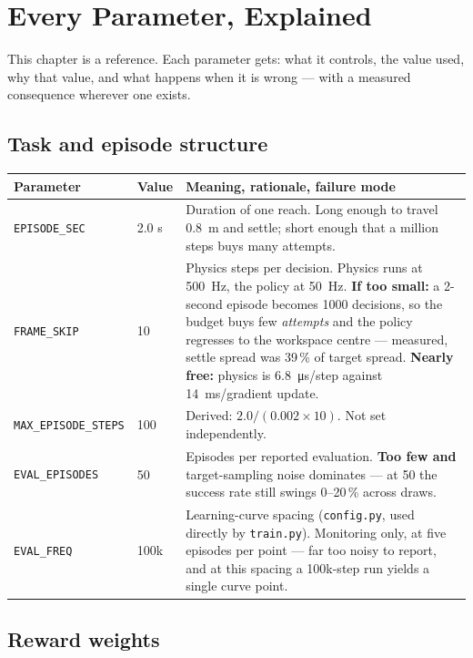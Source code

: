 \chapter{Every Parameter, Explained}

This chapter is a reference. Each parameter gets: what it controls, the value
used, why that value, and what happens when it is wrong --- with a measured
consequence wherever one exists.

\section{Task and episode structure}

\begin{longtable}{@{} L{3.4cm} C{2.0cm} L{9.0cm} @{}}
\toprule
\textbf{Parameter} & \textbf{Value} & \textbf{Meaning, rationale, failure mode} \\
\midrule
\endhead
\texttt{EPISODE\_SEC} & 2.0 s & Duration of one reach. Long enough to travel \SI{0.8}{\meter} and settle; short enough that a million steps buys many attempts. \\
\texttt{FRAME\_SKIP} & 10 & Physics steps per decision. Physics runs at \SI{500}{\hertz}, the policy at \SI{50}{\hertz}. \textbf{If too small:} a 2-second episode becomes 1000 decisions, so the budget buys few \emph{attempts} and the policy regresses to the workspace centre --- measured, settle spread was 39\,\% of target spread. \textbf{Nearly free:} physics is \SI{6.8}{\micro\second}/step against \SI{14}{\milli\second}/gradient update. \\
\texttt{MAX\_EPISODE\_STEPS} & 100 & Derived: $2.0 / (0.002 \times 10)$. Not set independently. \\
\texttt{EVAL\_EPISODES} & 50 & Episodes per reported evaluation. \textbf{Too few and} target-sampling noise dominates --- at 50 the success rate still swings 0--20\,\% across draws. \\
\texttt{EVAL\_FREQ} & 100k & Learning-curve spacing (\texttt{config.py}, used directly by \texttt{train.py}). Monitoring only, at five episodes per point --- far too noisy to report, and at this spacing a 100k-step run yields a single curve point. \\
\bottomrule
\end{longtable}

\section{Reward weights}

